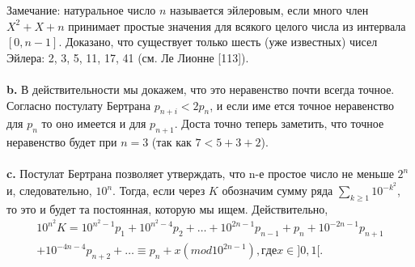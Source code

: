 Замечание: натуральное число $n$ называется эйлеровым, если много­\linebreak
член $X^{2} + X + n$ принимает простые значения для всякого целого числа\linebreak 
из интервала $[0, n - 1]$. Доказано, что существует только шесть (уже\linebreak
известных) чисел Эйлера: 2, 3, 5, 11, 17, 41 (см. Ле Лионне [113]).\\
\\
\hspace*{15pt}\textbf{b.} В действительности мы докажем, что это неравенство почти\linebreak
всегда точное. Согласно постулату Бертрана $p_{n+i} < 2p_n$,  и если име­\linebreak
ется точное неравенство для $p_n$ то оно имеется и для $p_{n+1}$. Доста­\linebreak
точно теперь заметить, что точное неравенство будет при $n = 3$ (так\linebreak
как $7 < 5 + 3 + 2$).\\
\\
\hspace*{15pt}\textbf{c.} Постулат Бертрана позволяет утверждать, что n-е простое число\linebreak
не меньше $2^{n}$ и, следовательно, $10^{n}$. Тогда, если через $K$ обозначим\linebreak
сумму ряда $\sum_{k\geq1}10^{-k^{2}}$, то это и будет та постоянная, которую мы\linebreak
ищем. Действительно,
		$$\begin{array}{ccc}
				10^{n^{2}}K = 10^{n^{2}-1}p_1 + 10^{n^{2}-4}p_2 +\ldots+10^{2n-1}p_{n-1} + p_n + 10^{-2n-1}p_{n+1}\\
				+ 10^{-4n-4}p_{n+2} +\ldots\equiv p_n + x (mod 10^{2n-1}), где x\in ]0,1[.\\
		\end{array}$$
		
